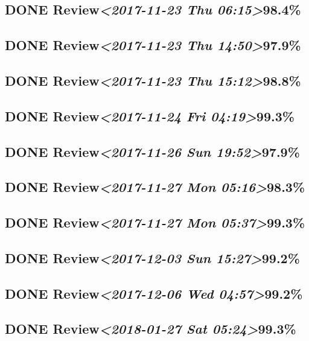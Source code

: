 \documentclass[11pt]{ctexart}
\begin{document}
\subsection{{\bfseries\sffamily DONE} Review\textit{<2017-11-23 Thu 06:15>}98.4\%}
\label{sec:org9d4f102}
\subsection{{\bfseries\sffamily DONE} Review\textit{<2017-11-23 Thu 14:50>}97.9\%}
\label{sec:org71311b5}
\subsection{{\bfseries\sffamily DONE} Review\textit{<2017-11-23 Thu 15:12>}98.8\%}
\label{sec:orgd114008}
\subsection{{\bfseries\sffamily DONE} Review\textit{<2017-11-24 Fri 04:19>}99.3\%}
\label{sec:orgbe51687}
\subsection{{\bfseries\sffamily DONE} Review\textit{<2017-11-26 Sun 19:52>}97.9\%}
\label{sec:orge1a5187}
\subsection{{\bfseries\sffamily DONE} Review\textit{<2017-11-27 Mon 05:16>}98.3\%}
\label{sec:org687657b}
\subsection{{\bfseries\sffamily DONE} Review\textit{<2017-11-27 Mon 05:37>}99.3\%}
\label{sec:org4b2cdb8}
\subsection{{\bfseries\sffamily DONE} Review\textit{<2017-12-03 Sun 15:27>}99.2\%}
\label{sec:org738d50a}
\subsection{{\bfseries\sffamily DONE} Review\textit{<2017-12-06 Wed 04:57>}99.2\%}
\label{sec:org027ea57}
\subsection{{\bfseries\sffamily DONE} Review\textit{<2018-01-27 Sat 05:24>}99.3\%}
\label{sec:orgf6d52e9}
\end{document}
